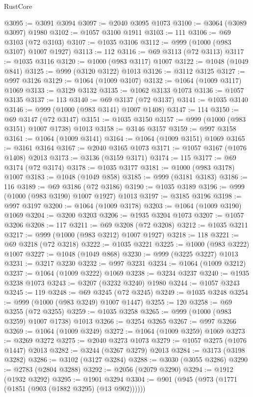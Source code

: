 \begin{lexlean}{RustCore}
\begin{coremodule}
@3095 := @3091 @3094
@3097 := @2040 @3095 @1073
@3100 := @3064 (@3089 @3097) @1980
@3102 := @1057 @3100 @1911
@3103 := 111
@3106 := @69 @3103 (@72 @3103)
@3107 := @1035 @3106
@3112 := @999 (@1000 (@983 @3107) @1007 @1927)
@3113 := 112
@3116 := @69 @3113 (@72 @3113)
@3117 := @1035 @3116
@3120 := @1000 (@983 @3117) @1007
@3122 := @1048 (@1049 @841)
@3125 := @999 (@3120 @3122) @1013
@3126 := @3112 @3125
@3127 := @997 @3126
@3129 := @1064 (@1009 @3107)
@3132 := @1064 (@1009 @3117) @1069
@3133 := @3129 @3132
@3135 := @1062 @3133 @1073
@3136 := @1057 @3135
@3137 := 113
@3140 := @69 @3137 (@72 @3137)
@3141 := @1035 @3140
@3146 := @999 (@1000 (@983 @3141) @1007 @1408)
@3147 := 114
@3150 := @69 @3147 (@72 @3147)
@3151 := @1035 @3150
@3157 := @999 (@1000 (@983 @3151) @1007 @1738) @1013
@3158 := @3146 @3157
@3159 := @997 @3158
@3161 := @1064 (@1009 @3141)
@3164 := @1064 (@1009 @3151) @1069
@3165 := @3161 @3164
@3167 := @2040 @3165 @1073
@3171 := @1057 @3167 (@1076 @1408) @2013
@3173 := @3136 (@3159 @3171)
@3174 := 115
@3177 := @69 @3174 (@72 @3174)
@3178 := @1035 @3177
@3181 := @1000 (@983 @3178) @1007
@3183 := @1048 (@1049 @858)
@3185 := @999 (@3181 @3183)
@3186 := 116
@3189 := @69 @3186 (@72 @3186)
@3190 := @1035 @3189
@3196 := @999 (@1000 (@983 @3190) @1007 @1927) @1013
@3197 := @3185 @3196
@3198 := @997 @3197
@3200 := @1064 (@1009 @3178)
@3203 := @1064 (@1009 @3190) @1069
@3204 := @3200 @3203
@3206 := @1935 @3204 @1073
@3207 := @1057 @3206
@3208 := 117
@3211 := @69 @3208 (@72 @3208)
@3212 := @1035 @3211
@3217 := @999 (@1000 (@983 @3212) @1007 @1927)
@3218 := 118
@3221 := @69 @3218 (@72 @3218)
@3222 := @1035 @3221
@3225 := @1000 (@983 @3222) @1007
@3227 := @1048 (@1049 @868)
@3230 := @999 (@3225 @3227) @1013
@3231 := @3217 @3230
@3232 := @997 @3231
@3234 := @1064 (@1009 @3212)
@3237 := @1064 (@1009 @3222) @1069
@3238 := @3234 @3237
@3240 := @1935 @3238 @1073
@3243 := @3207 (@3232 @3240) @1980
@3244 := @1057 @3243
@3245 := 119
@3248 := @69 @3245 (@72 @3245)
@3249 := @1035 @3248
@3254 := @999 (@1000 (@983 @3249) @1007 @1447)
@3255 := 120
@3258 := @69 @3255 (@72 @3255)
@3259 := @1035 @3258
@3265 := @999 (@1000 (@983 @3259) @1007 @1738) @1013
@3266 := @3254 @3265
@3267 := @997 @3266
@3269 := @1064 (@1009 @3249)
@3272 := @1064 (@1009 @3259) @1069
@3273 := @3269 @3272
@3275 := @2040 @3273 @1073
@3279 := @1057 @3275 (@1076 @1447) @2013
@3282 := @3244 (@3267 @3279) @2013
@3284 := @3173 (@3198 @3282)
@3286 := @3102 (@3127 @3284)
@3288 := @3030 (@3055 @3286)
@3290 := @2783 (@2804 @3288)
@3292 := @2056 (@2079 @3290)
@3294 := @1912 (@1932 @3292)
@3295 := @1901 @3294
@3304 := @901 (@945 (@973 (@1771 (@1851 (@903 (@1882 @3295) (@13 @902))))))

\end{coremodule}
\end{lexlean}
